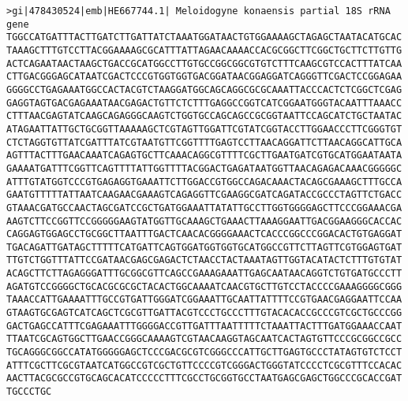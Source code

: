 \documentclass[11pt]{article}
\begin{document}
\begin{Verbatim}[commandchars=\\\{\}]
>gi|478430524|emb|HE667744.1| Meloidogyne konaensis partial 18S rRNA gene
TGGCCATGATTTACTTGATCTTGATTATCTAAATGGATAACTGTGGAAAAGCTAGAGCTAATACATGCAC
TAAAGCTTTGTCCTTACGGAAAAGCGCATTTATTAGAACAAAACCACGCGGCTTCGGCTGCTTCTTGTTG
ACTCAGAATAACTAAGCTGACCGCATGGCCTTGTGCCGGCGGCGTGTCTTTCAAGCGTCCACTTTATCAA
CTTGACGGGAGCATAATCGACTCCCGTGGTGGTGACGGATAACGGAGGATCAGGGTTCGACTCCGGAGAA
GGGGCCTGAGAAATGGCCACTACGTCTAAGGATGGCAGCAGGCGCGCAAATTACCCACTCTCGGCTCGAG
GAGGTAGTGACGAGAAATAACGAGACTGTTCTCTTTGAGGCCGGTCATCGGAATGGGTACAATTTAAACC
CTTTAACGAGTATCAAGCAGAGGGCAAGTCTGGTGCCAGCAGCCGCGGTAATTCCAGCATCTGCTAATAC
ATAGAATTATTGCTGCGGTTAAAAAGCTCGTAGTTGGATTCGTATCGGTACCTTGGAACCCTTCGGGTGT
CTCTAGGTGTTATCGATTTATCGTAATGTTCGGTTTTGAGTCCTTAACAGGATTCTTAACAGGCATTGCA
AGTTTACTTTGAACAAATCAGAGTGCTTCAAACAGGCGTTTTCGCTTGAATGATCGTGCATGGAATAATA
GAAAATGATTTCGGTTCAGTTTTATTGGTTTTACGGACTGAGATAATGGTTAACAGAGACAAACGGGGGC
ATTTGTATGGTCCCGTGAGAGGTGAAATTCTTGGACCGTGGCCAGACAAACTACAGCGAAAGCTTTGCCA
GAATGTTTTTATTAATCAAGAACGAAAGTCAGAGGTTCGAAGGCGATCAGATACCGCCCTAGTTCTGACC
GTAAACGATGCCAACTAGCGATCCGCTGATGGAAATTATATTGCCTTGGTGGGGAGCTTCCCGGAAACGA
AAGTCTTCCGGTTCCGGGGGAAGTATGGTTGCAAAGCTGAAACTTAAAGGAATTGACGGAAGGGCACCAC
CAGGAGTGGAGCCTGCGGCTTAATTTGACTCAACACGGGGAAACTCACCCGGCCCGGACACTGTGAGGAT
TGACAGATTGATAGCTTTTTCATGATTCAGTGGATGGTGGTGCATGGCCGTTCTTAGTTCGTGGAGTGAT
TTGTCTGGTTTATTCCGATAACGAGCGAGACTCTAACCTACTAAATAGTTGGTACATACTCTTTGTGTAT
ACAGCTTCTTAGAGGGATTTGCGGCGTTCAGCCGAAAGAAATTGAGCAATAACAGGTCTGTGATGCCCTT
AGATGTCCGGGGCTGCACGCGCGCTACACTGGCAAAATCAACGTGCTTGTCCTACCCCGAAAGGGGCGGG
TAAACCATTGAAAATTTGCCGTGATTGGGATCGGAAATTGCAATTATTTTCCGTGAACGAGGAATTCCAA
GTAAGTGCGAGTCATCAGCTCGCGTTGATTACGTCCCTGCCCTTTGTACACACCGCCCGTCGCTGCCCGG
GACTGAGCCATTTCGAGAAATTTGGGGACCGTTGATTTAATTTTTCTAAATTACTTTGATGGAAACCAAT
TTAATCGCAGTGGCTTGAACCGGGCAAAAGTCGTAACAAGGTAGCAATCACTAGTGTTCCCGCGGCCGCC
TGCAGGGCGGCCATATGGGGGAGCTCCCGACGCGTCGGGCCCATTGCTTGAGTGCCCTATAGTGTCTCCT
ATTTCGCTTCGCGTAATCATGGCCGTCGCTGTTCCCCGTCGGGACTGGGTATCCCCTCGCGTTTCCACAC
AACTTACGCGCCGTGCAGCACATCCCCCTTTCGCCTGCGGTGCCTAATGAGCGAGCTGGCCCGCACCGAT
TGCCCTGC


\end{Verbatim}
\end{document}
